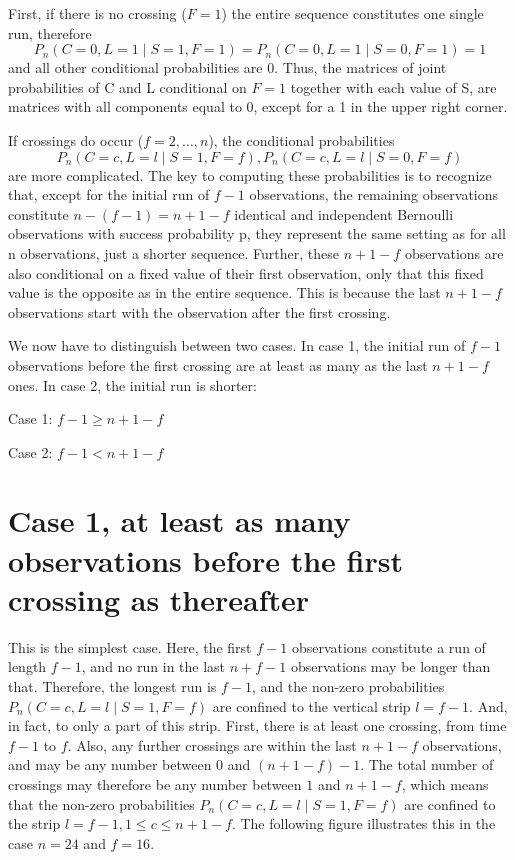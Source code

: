First, if there is no crossing ($F=1$) the entire sequence constitutes one single run, therefore $$P_n (C=0,L=1 \mid S=1,F=1)=P_n (C=0,L=1 \mid S=0,F=1)=1$$
and all other conditional probabilities are 0. Thus, the matrices of joint probabilities of C and L conditional on $F=1$ together with each value of S, are matrices with all components equal to 0, except for a 1 in the upper right corner.

If crossings do occur ($f=2, \ldots ,n$), the conditional probabilities $$P_n (C=c,L=l \mid S=1,F=f), P_n (C=c,L=l \mid S=0,F=f)$$ are more complicated. The key to computing these probabilities is to recognize that, except for the initial run of $f-1$ observations, the remaining observations constitute $n-(f-1)=n+1-f$ identical and independent Bernoulli observations with success probability p, they represent the same setting as for all n observations, just a shorter sequence. Further, these $n+1-f$ observations are also conditional on a fixed value of their first observation, only that this fixed value is the opposite as in the entire sequence. This is because the last $n+1-f$ observations start with the  observation after the first crossing. 

We now have to distinguish between two cases. In case 1, the initial run of $f-1$ observations before the first crossing are at least as many as the last $n+1-f$ ones. In case 2, the initial run is shorter:

Case 1: $f-1 \geq n+1-f$

Case 2: $f-1<n+1-f$

\section{Case 1, at least as many observations before the first crossing as thereafter}

This is the simplest case. Here, the first $f-1$ observations constitute a run of length $f-1$, and no run in the last $n+f-1$ observations may be longer than that. Therefore, the longest run is $f-1$, and the non-zero probabilities $P_n (C=c,L=l \mid S=1,F=f)$ are confined to the vertical strip $l=f-1$. And, in fact, to only a part of this strip. First, there is at least one crossing, from time $f-1$ to $f$. Also, any further crossings are within the last $n+1-f$ observations, and may be any number between $0$ and $(n+1-f) - 1$. The total number of crossings may therefore be any number between $1$ and $n+1-f$, which means that the non-zero probabilities $P_n (C=c,L=l \mid S=1,F=f)$ are confined to the strip $l=f-1, 1 \leq c \leq n+1-f$. The following figure illustrates this in the case $n=24$ and $f=16$.

